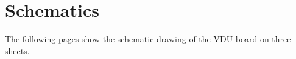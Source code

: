 

\clearpage
\section{Schematics}

The following pages show the schematic drawing of the \gls{VDU} board on three sheets.

\cleardoublepage
{
  \def\schematicsFile{figs/video-max5.pdf}
}


